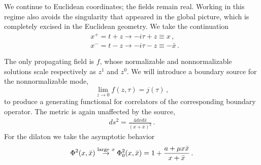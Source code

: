 \documentclass[12pt]{article}
\newcommand{\AAl}[1]{{\emph{\textcolor{blue}{#1}}}}
\newcommand{\be}{\begin{equation}}
\newcommand{\ee}{\end{equation}}
\begin{document}
We continue to Euclidean coordinates; the fields remain real. Working in this regime also avoids the singularity that appeared in the global picture, which is completely excised in the Euclidean geometry. We take the continuation
\begin{align}
&x^+ = t + z \rightarrow -i \tau + z \equiv x \,, \nonumber\\
&x^- = t - z \rightarrow -i \tau - z \equiv - \bar{x} \,.
\end{align}

The only propagating field is $f$, whose normalizable and nonnormalizable solutions scale respectively as $z^1$ and $z^0$.
We will introduce a boundary source for the nonnormalizable mode,
\begin{equation}
\lim_{z \to 0} f(z,\tau) = j(\tau)\,, \label{boundc}
\end{equation}
to produce a generating functional for correlators of the corresponding boundary operator.  The metric is again unaffected by the source,
\begin{align}
ds^2 = \frac{4 dx d\bar x}{(x + \bar x)^2} \,.
\label{euclidean:metric}
\end{align}
For the dilaton we take the asymptotic behavior
\be
\Phi^2(x,\bar x) \stackrel{{\rm large}\ x}{\to} \Phi_0^2(x,\bar x) = 1 + \frac{a + \mu x\bar x}{x+\bar x} \,.
\label{euclidean:dilaton}
\ee
\end{document}
